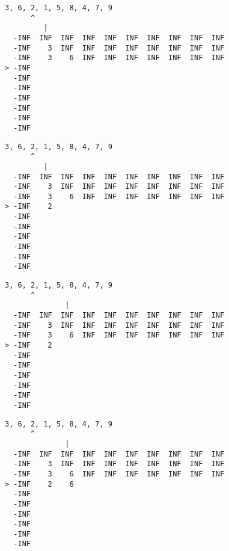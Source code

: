 { \begin{verbatim}
3, 6, 2, 1, 5, 8, 4, 7, 9
      ^
         |
  -INF  INF  INF  INF  INF  INF  INF  INF  INF  INF
  -INF    3  INF  INF  INF  INF  INF  INF  INF  INF
  -INF    3    6  INF  INF  INF  INF  INF  INF  INF
> -INF                                             
  -INF                                             
  -INF                                             
  -INF                                             
  -INF                                             
  -INF                                             
  -INF                                             
\end{verbatim} }

{ \begin{verbatim}
3, 6, 2, 1, 5, 8, 4, 7, 9
      ^
         |
  -INF  INF  INF  INF  INF  INF  INF  INF  INF  INF
  -INF    3  INF  INF  INF  INF  INF  INF  INF  INF
  -INF    3    6  INF  INF  INF  INF  INF  INF  INF
> -INF    2                                        
  -INF                                             
  -INF                                             
  -INF                                             
  -INF                                             
  -INF                                             
  -INF                                             
\end{verbatim} }

{ \begin{verbatim}
3, 6, 2, 1, 5, 8, 4, 7, 9
      ^
              |
  -INF  INF  INF  INF  INF  INF  INF  INF  INF  INF
  -INF    3  INF  INF  INF  INF  INF  INF  INF  INF
  -INF    3    6  INF  INF  INF  INF  INF  INF  INF
> -INF    2                                        
  -INF                                             
  -INF                                             
  -INF                                             
  -INF                                             
  -INF                                             
  -INF                                             
\end{verbatim} }

{ \begin{verbatim}
3, 6, 2, 1, 5, 8, 4, 7, 9
      ^
              |
  -INF  INF  INF  INF  INF  INF  INF  INF  INF  INF
  -INF    3  INF  INF  INF  INF  INF  INF  INF  INF
  -INF    3    6  INF  INF  INF  INF  INF  INF  INF
> -INF    2    6                                   
  -INF                                             
  -INF                                             
  -INF                                             
  -INF                                             
  -INF                                             
  -INF                                             
\end{verbatim} }


